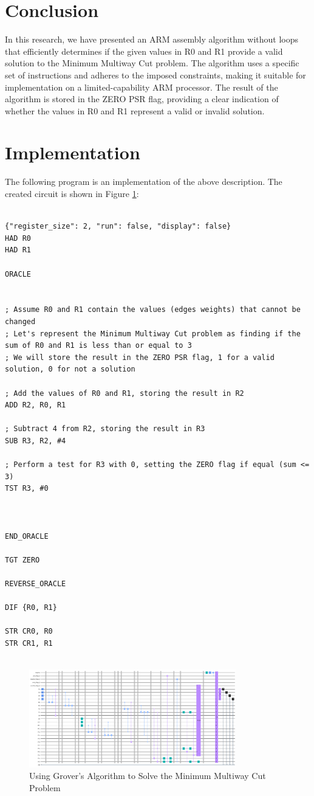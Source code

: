 \section{Conclusion}

In this research, we have presented an ARM assembly algorithm without loops that efficiently determines if the given values in R0 and R1 provide a valid solution to the Minimum Multiway Cut problem. The algorithm uses a specific set of instructions and adheres to the imposed constraints, making it suitable for implementation on a limited-capability ARM processor. The result of the algorithm is stored in the ZERO PSR flag, providing a clear indication of whether the values in R0 and R1 represent a valid or invalid solution.




\section{Implementation}

The following program is an implementation of the above description. The created circuit is shown in Figure \ref{fig:Minimum_Multiway_Cut}:

\begin{lstlisting}

{"register_size": 2, "run": false, "display": false}
HAD R0
HAD R1

ORACLE


; Assume R0 and R1 contain the values (edges weights) that cannot be changed
; Let's represent the Minimum Multiway Cut problem as finding if the sum of R0 and R1 is less than or equal to 3
; We will store the result in the ZERO PSR flag, 1 for a valid solution, 0 for not a solution

; Add the values of R0 and R1, storing the result in R2
ADD R2, R0, R1

; Subtract 4 from R2, storing the result in R3
SUB R3, R2, #4

; Perform a test for R3 with 0, setting the ZERO flag if equal (sum <= 3)
TST R3, #0



END_ORACLE

TGT ZERO

REVERSE_ORACLE

DIF {R0, R1}

STR CR0, R0
STR CR1, R1


\end{lstlisting}

\begin{figure}[htp]
    \centering
    \includegraphics[width=9cm]{Figures/Minimum_Multiway_Cut_circuit.png}
    \caption{Using Grover's Algorithm to Solve the Minimum Multiway Cut Problem}
    \label{fig:Minimum_Multiway_Cut}
\end{figure}

